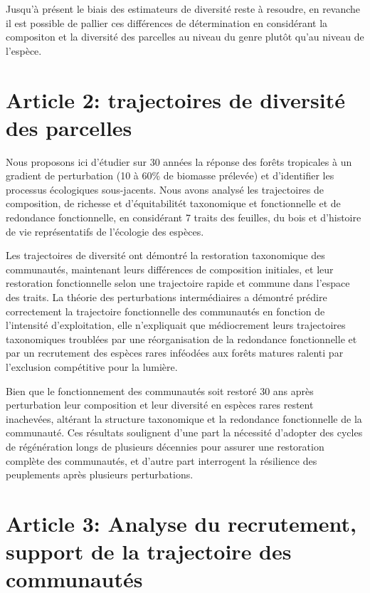\documentclass[
  11pt,
  french,
  A4paper,
  extrafontsizes,onecolumn,openright
  ]{memoir}
\begin{document}
Jusqu'à présent le biais des estimateurs de diversité reste à resoudre,
en revanche il est possible de pallier ces différences de détermination
en considérant la compositon et la diversité des parcelles au niveau du
genre plutôt qu'au niveau de l'espèce.

\chapter{Article 2: trajectoires de diversité des
parcelles}\label{article-2-trajectoires-de-diversite-des-parcelles}

Nous proposons ici d'étudier sur 30 années la réponse des forêts
tropicales à un gradient de perturbation (10 à 60\% de biomasse
prélevée) et d'identifier les processus écologiques sous-jacents. Nous
avons analysé les trajectoires de composition, de richesse et
d'équitabilitét taxonomique et fonctionnelle et de redondance
fonctionnelle, en considérant 7 traits des feuilles, du bois et
d'histoire de vie représentatifs de l'écologie des espèces.

Les trajectoires de diversité ont démontré la restoration taxonomique
des communautés, maintenant leurs différences de composition initiales,
et leur restoration fonctionnelle selon une trajectoire rapide et
commune dans l'espace des traits. La théorie des perturbations
intermédiaires a démontré prédire correctement la trajectoire
fonctionnelle des communautés en fonction de l'intensité d'exploitation,
elle n'expliquait que médiocrement leurs trajectoires taxonomiques
troublées par une réorganisation de la redondance fonctionnelle et par
un recrutement des espèces rares inféodées aux forêts matures ralenti
par l'exclusion compétitive pour la lumière.

Bien que le fonctionnement des communautés soit restoré 30 ans après
perturbation leur composition et leur diversité en espèces rares restent
inachevées, altérant la structure taxonomique et la redondance
fonctionnelle de la communauté. Ces résultats soulignent d'une part la
nécessité d'adopter des cycles de régénération longs de plusieurs
décennies pour assurer une restoration complète des communautés, et
d'autre part interrogent la résilience des peuplements après plusieurs
perturbations.

\chapter{Article 3: Analyse du recrutement, support de la trajectoire
des
communautés}\label{article-3-analyse-du-recrutement-support-de-la-trajectoire-des-communautes}
\end{document}
